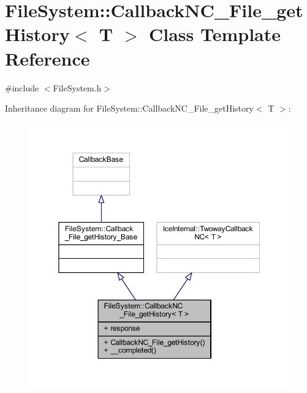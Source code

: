 \hypertarget{class_file_system_1_1_callback_n_c___file__get_history}{}\section{File\+System\+:\+:Callback\+N\+C\+\_\+\+File\+\_\+get\+History$<$ T $>$ Class Template Reference}
\label{class_file_system_1_1_callback_n_c___file__get_history}


{\ttfamily \#include $<$File\+System.\+h$>$}



Inheritance diagram for File\+System\+:\+:Callback\+N\+C\+\_\+\+File\+\_\+get\+History$<$ T $>$\+:
\nopagebreak
\begin{figure}[H]
\begin{center}
\leavevmode
\includegraphics[width=350pt]{class_file_system_1_1_callback_n_c___file__get_history__inherit__graph}
\end{center}
\end{figure}



